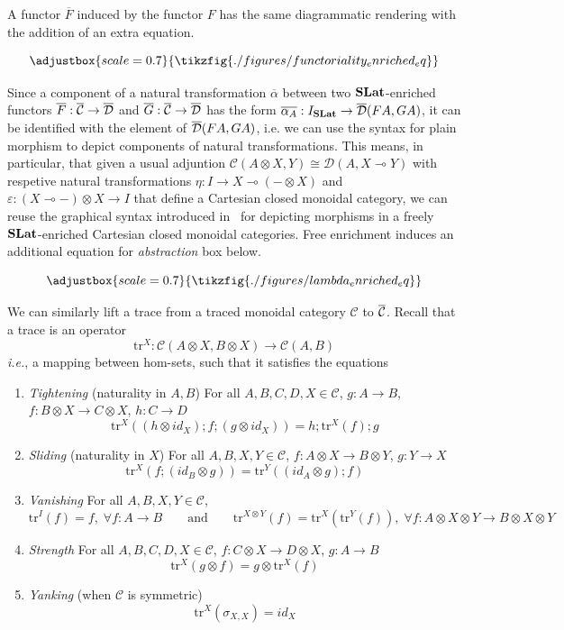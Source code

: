 \documentclass[acmsmall, screen, nonacm]{acmart}
\begin{document}
A functor $\overline{F}$ induced by the functor $F$ has the same diagrammatic rendering with the addition of an extra equation.

\[
\adjustbox{scale=0.7}{
\tikzfig{./figures/functoriality_enriched_eq}
}
\]

Since a component of a natural transformation $\overline{\alpha}$ between two $\mathbf{SLat}$-enriched functors $\overline{F} : {\overline{\mathcal{C}}} \to {\overline{\mathcal{D}}}$ and $\overline{G}: {\overline{\mathcal{C}}} \to {\overline{\mathcal{D}}}$ has the form $\overline{\alpha_{A}} : I_{\mathbf{SLat}} \to {\overline{\mathcal{D}}}(FA, GA)$, it can be identified with the element of ${\overline{\mathcal{D}}}(FA,GA)$, i.e. we can use the syntax for plain morphism to depict components of natural transformations.
This means, in particular, that given a usual adjuntion $\mathcal{C}(A \otimes X, Y) \cong \mathcal{D}(A, X \multimap Y)$ with respetive natural transformations $\eta : I \to X \multimap (- \otimes X)$ and $\varepsilon : (X \multimap -) \otimes X \to I$ that define a Cartesian closed monoidal category, we can reuse the graphical syntax introduced in~\cite{GhicaZanassiStringLambda}
for depicting morphisms in a freely $\mathbf{SLat}$-enriched Cartesian closed monoidal categories.
Free enrichment induces an additional equation for \textit{abstraction} box below.

\[
\adjustbox{scale=0.7}{
  \tikzfig{./figures/lambda_enriched_eq}
}
\]

We can similarly lift a trace from a traced monoidal category $\mathcal{C}$ to ${\overline{\mathcal{C}}}$.
Recall that a trace is an operator
\[
\text{tr}^{X} : \mathcal{C}(A \otimes X, B \otimes X) \to \mathcal{C}(A,B)
\]
\textit{i.e.}, a mapping between hom-sets, such that it satisfies the equations
\begin{enumerate}
  \item \textit{Tightening} (naturality in $A,B$) For all $A, B, C, D, X \in \mathcal{C}$, $g : A \to B$, $f : B \otimes X \to C \otimes X$, $h : C \to D$
  \[
  \text{tr}^{X}((h \otimes id_{X});f;(g \otimes id_{X})) = h;\text{tr}^{X}(f);g
  \]
  \item \textit{Sliding} (naturality in $X$) For all $A,B,X,Y \in \mathcal{C}$, $f : A \otimes X \to B \otimes Y$, $g : Y \to X$
  \[
   \text{tr}^{X}(f;(id_{B} \otimes g)) = \text{tr}^{Y}((id_{A} \otimes g); f) 
  \]
  \item \textit{Vanishing} For all $A,B,X,Y \in \mathcal{C}$,
  \[
  \text{tr}^{I}(f) = f,\; \forall f : A \to B \qquad \text{and} \qquad \text{tr}^{X \otimes Y}(f) = \text{tr}^{X}(\text{tr}^{Y}(f)), \; \forall f : A \otimes X \otimes Y \to B \otimes X \otimes Y
  \]
  \item \textit{Strength} For all $A,B,C,D,X \in \mathcal{C}$, $f : C \otimes X \to D \otimes X$, $g : A \to B$
    \[
    \text{tr}^{X}(g \otimes f) = g \otimes \text{tr}^{X}(f)
    \] 
  \item \textit{Yanking} (when $\mathcal{C}$ is symmetric)
    \[
    \text{tr}^{X}(\sigma_{X,X}) = id_{X}
    \]
\end{enumerate}
\end{document}

